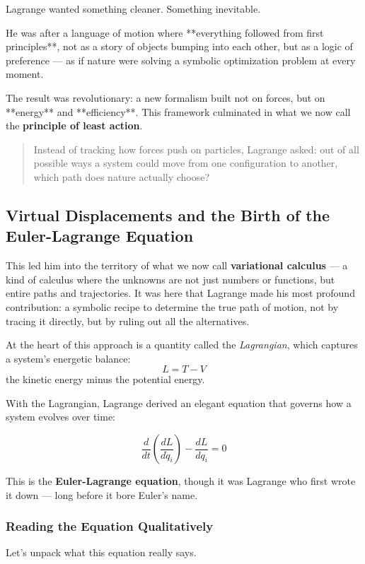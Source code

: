 Lagrange wanted something cleaner. Something inevitable.

He was after a language of motion where **everything followed from first principles**, not as a story of objects bumping into each other, but as a logic of preference — as if nature were solving a symbolic optimization problem at every moment.

The result was revolutionary: a new formalism built not on forces, but on **energy** and **efficiency**. This framework culminated in what we now call the \textbf{principle of least action}.

\begin{quote}
    Instead of tracking how forces push on particles, Lagrange asked: out of all possible ways a system could move from one configuration to another, which path does nature actually choose?
\end{quote}

\subsection{Virtual Displacements and the Birth of the Euler-Lagrange Equation}

This led him into the territory of what we now call \textbf{variational calculus} — a kind of calculus where the unknowns are not just numbers or functions, but entire paths and trajectories. It was here that Lagrange made his most profound contribution: a symbolic recipe to determine the true path of motion, not by tracing it directly, but by ruling out all the alternatives.

At the heart of this approach is a quantity called the \textit{Lagrangian}, which captures a system’s energetic balance:
\[
L = T - V
\]
the kinetic energy minus the potential energy.

With the Lagrangian, Lagrange derived an elegant equation that governs how a system evolves over time:

\[
\frac{d}{dt} \left( \frac{dL}{d\dot{q}_i} \right) - \frac{dL}{dq_i} = 0
\]

This is the \textbf{Euler-Lagrange equation}, though it was Lagrange who first wrote it down — long before it bore Euler’s name.

\subsubsection{Reading the Equation Qualitatively}

Let’s unpack what this equation really says.

